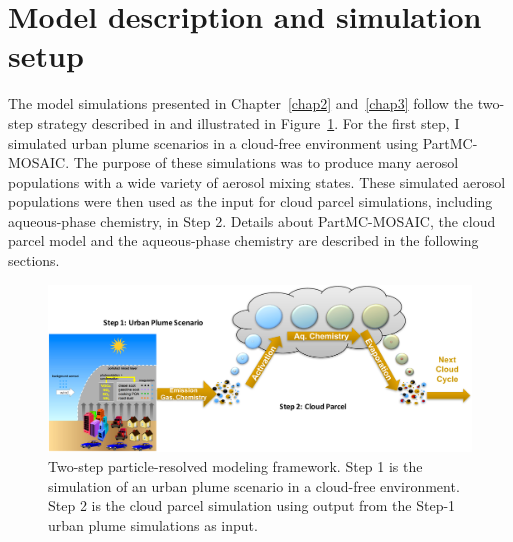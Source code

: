 \documentclass[edeposit,fullpage]{uiucthesis2009}
\begin{document}
\section{Model description and simulation setup}
\label{chap2.2}
The model simulations presented in Chapter~\ref{chap2} and~\ref{chap3}
follow the two-step strategy described in \citet{ching2012impacts} and
illustrated in Figure~\ref{chap2-fig1-frame}. For the first step, I
simulated urban plume scenarios in a cloud-free environment using
PartMC-MOSAIC. The purpose of these simulations was to produce many
aerosol populations with a wide variety of aerosol mixing
states. These simulated aerosol populations were then used as the
input for cloud parcel simulations, including aqueous-phase chemistry,
in Step 2. Details about PartMC-MOSAIC, the cloud parcel model and the
aqueous-phase chemistry are described in the following sections.

\begin{figure}[ht]
    \centering 
    \includegraphics[scale=0.4]{chap2_figs/chap2-fig1-frame.pdf}
    \caption{Two-step particle-resolved modeling framework. Step 1 is
      the simulation of an urban plume scenario in a cloud-free
      environment. Step 2 is the cloud parcel simulation using output
      from the Step-1 urban plume simulations as input.}
    \label{chap2-fig1-frame}
\end{figure}
\end{document}
